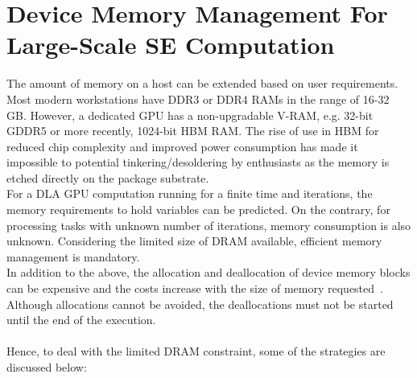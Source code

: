 \documentclass[thesis.tex]{subfiles}
\begin{document}
\section{Device Memory Management For Large-Scale SE Computation}\label{dmmse}
The amount of memory on a host can be extended based on user requirements. Most modern workstations have DDR3 or DDR4 RAMs in the range of 16-32 GB. However, a dedicated GPU has a non-upgradable V-RAM, e.g. 32-bit GDDR5 or more recently, 1024-bit HBM RAM. The rise of use in HBM for reduced chip complexity and improved power consumption has made it impossible to potential tinkering/desoldering by enthusiasts as the memory is etched directly on the package substrate. \\
For a DLA GPU computation running for a finite time and iterations, the memory requirements to hold variables can be predicted. On the contrary, for processing tasks with unknown number of iterations, memory consumption is also unknown. Considering the limited size of DRAM available, efficient memory management is mandatory.\\
In addition to the above, the allocation and deallocation of device memory blocks can be expensive and the costs increase with the size of memory requested~\cite{allocationOverhead}. Although allocations cannot be avoided, the deallocations must not be started until the end of the execution.\\\\
Hence, to deal with the limited DRAM constraint, some of the strategies are discussed below:
\end{document}
